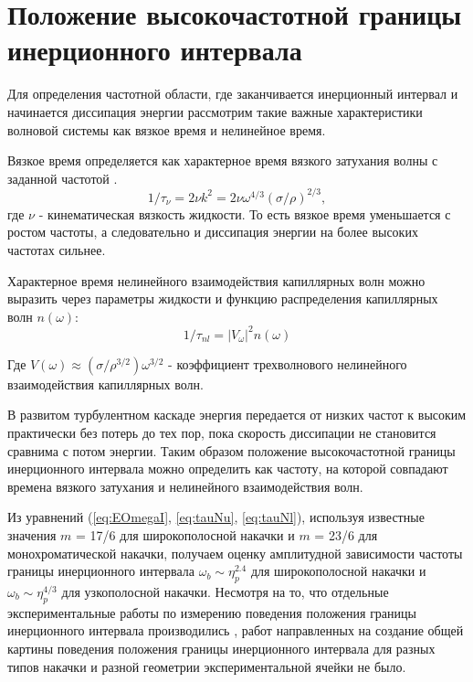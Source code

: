 \section{Положение высокочастотной границы инерционного интервала}%

Для определения частотной области, где заканчивается инерционный интервал и начинается диссипация энергии рассмотрим такие важные характеристики волновой системы как вязкое время и нелинейное время.

Вязкое время определяется как характерное время вязкого затухания волны с заданной частотой \cite[стр. 135]{land}.
\begin{equation}
\label{eq:tauNu}
1/\tau_\nu = 2\nu k^2 = 2 \nu \omega^{4/3}(\sigma/\rho)^{2/3},
\end{equation}
где $\nu$ - кинематическая вязкость жидкости.
То есть вязкое время уменьшается с ростом частоты, а следовательно и диссипация энергии на более высоких частотах сильнее.


Характерное время нелинейного взаимодействия капиллярных волн можно выразить через параметры жидкости и функцию распределения капиллярных волн $n(\omega)$:
\begin{equation}
\label{eq:tauNl}
1/\tau_{nl} = |V_\omega|^2 n(\omega)
\end{equation}

Где $V(\omega) \approx (\sigma/\rho^{3/2})\omega^{3/2}$ - коэффициент трехволнового нелинейного взаимодействия капиллярных волн.

В развитом турбулентном каскаде энергия передается от низких частот к высоким практически без потерь до тех пор, пока скорость диссипации не становится сравнима с потом энергии. Таким образом положение высокочастотной границы инерционного интервала можно определить как частоту, на которой совпадают времена вязкого затухания и нелинейного взаимодействия волн.

Из уравнений (\ref{eq:EOmegaI}, \ref{eq:tauNu}, \ref{eq:tauNl}), используя известные значения $m$ = 17/6 для широкополосной накачки и $m$ = 23/6 для монохроматической накачки, получаем оценку амплитудной зависимости частоты границы инерционного интервала $\omega_b \sim \eta_p^{2.4}$ для широкополосной накачки и $\omega_b \sim \eta_p^{4/3}$ для узкополосной накачки. Несмотря на то, что отдельные экспериментальные работы по измерению поведения положения границы инерционного интервала производились \cite{Brazhnikov_bound_freq}, работ направленных на создание общей картины поведения положения границы инерционного интервала для разных типов накачки и разной геометрии экспериментальной ячейки не было.

